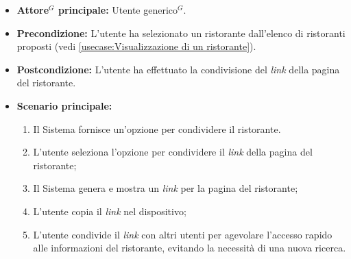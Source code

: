 \label{usecase:Condivisione link del ristorante}
\begin{itemize}
	\item \textbf{\gls{Attore}$^G$ principale:} \gls{Utente generico}$^G$.


	\item \textbf{Precondizione:}
	      L'utente ha selezionato un ristorante dall'elenco di ristoranti
	      proposti (vedi \autoref{usecase:Visualizzazione di un ristorante}).

	\item \textbf{Postcondizione:}
	      L'utente ha effettuato la condivisione del \textit{link} della pagina del ristorante.

	\item \textbf{Scenario principale:}
	      \begin{enumerate}
		      \item Il Sistema fornisce un'opzione per condividere il ristorante.
		      \item L'utente seleziona l'opzione per condividere il \textit{link} della pagina del ristorante;
		      \item Il Sistema genera e mostra un \textit{link} per la pagina del ristorante;
		      \item L'utente copia il \textit{link} nel dispositivo;
		      \item L'utente condivide il \textit{link} con altri utenti per agevolare l'accesso rapido alle
		            informazioni del ristorante, evitando la necessità di una nuova ricerca.
	      \end{enumerate}
\end{itemize}
